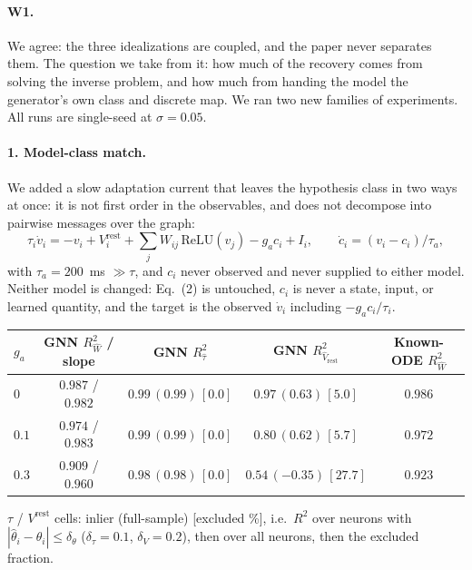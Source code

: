 \providecommand{\Rw}{R^2_{\widehat W}}
\providecommand{\Rt}{R^2_{\widehat\tau}}
\providecommand{\Rv}{R^2_{\widehat V_{\mathrm{rest}}}}

\paragraph{W1.}
We agree: the three idealizations are coupled, and the paper never separates them. The question we take from it: how much of the
recovery comes from solving the inverse problem, and how much from handing the
model the generator's own class and discrete map. We ran two new families of
experiments. All runs are single-seed at $\sigma=0.05$.

\paragraph{1. Model-class match.}
We added a slow adaptation current that leaves the hypothesis class in two ways at
once: it is not first order in the observables, and does not decompose into
pairwise messages over the graph:
\[
  \tau_i \dot v_i = -v_i + V^{\mathrm{rest}}_i
  + \sum_j W_{ij}\,\mathrm{ReLU}(v_j) - g_a c_i + I_i ,
  \qquad
  \dot c_i = (v_i - c_i)/\tau_a ,
\]
with $\tau_a = 200$~ms $\gg \tau$, and $c_i$ never observed and never supplied to
either model. Neither model is changed: Eq.~(2) is untouched, $c_i$ is never a
state, input, or learned quantity, and the target is the observed $\dot v_i$
including $-g_a c_i/\tau_i$.

\begin{center}
{\footnotesize
\begin{tabular}{lcccc}
\toprule
$g_a$ & GNN $\Rw$ / slope & GNN $\Rt$ & GNN $\Rv$ & Known-ODE $\Rw$ \\
\midrule
$0$   & $0.987$ / $0.982$ & $0.99\,(0.99)\,[0.0]$ & $0.97\,(0.63)\,[5.0]$  & $0.986$ \\
$0.1$ & $0.974$ / $0.983$ & $0.99\,(0.99)\,[0.0]$ & $0.80\,(0.62)\,[5.7]$  & $0.972$ \\
$0.3$ & $0.909$ / $0.960$ & $0.98\,(0.98)\,[0.0]$ & $0.54\,(-0.35)\,[27.7]$ & $0.923$ \\
\bottomrule
\end{tabular}}

{\footnotesize $\tau$ / $V^{\mathrm{rest}}$ cells: inlier (full-sample)
[excluded \%], i.e.\ $R^2$ over neurons with
$|\hat\theta_i-\theta_i|\leq\delta_\theta$ ($\delta_\tau{=}0.1$,
$\delta_{V}{=}0.2$), then over all neurons, then the excluded fraction.}
\end{center}

